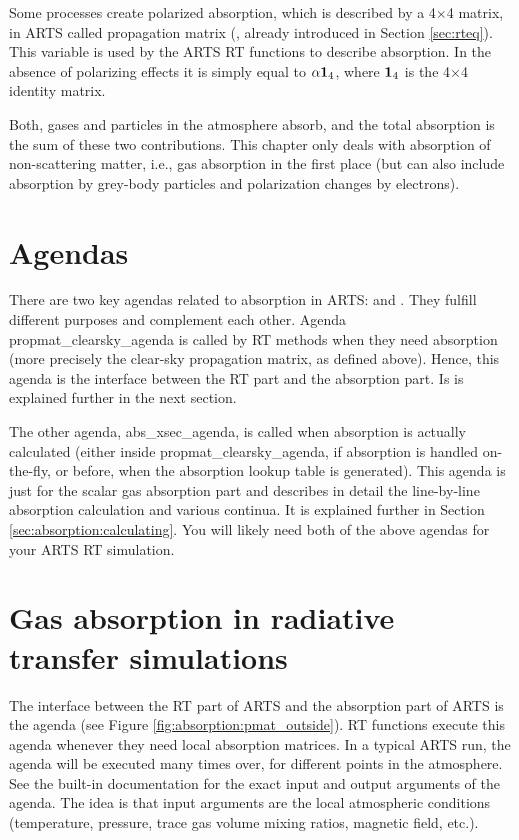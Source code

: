 Some processes create polarized absorption, which is described by a
4$\times$4 matrix, in ARTS called propagation matrix
(, already introduced in Section \ref{sec:rteq}).
This variable is used by the ARTS RT
functions to describe absorption.  In the absence of polarizing
effects it is simply equal to ${\alpha} \mathbf{1}_4$, where $\mathbf{1}_4$
is the 4$\times$4 identity matrix. 

Both, gases and particles in the atmosphere absorb, and the total absorption is
the sum of these two contributions.
This chapter only deals with absorption of non-scattering matter, i.e., gas
absorption in the first place (but can also include absorption by grey-body
particles and polarization changes by electrons).

\section{Agendas}
\label{sec:absorption:agendas}

There are two key agendas related to absorption in ARTS:
 and
.  They fulfill different purposes and
complement each other.  Agenda propmat\_clearsky\_agenda is called by
RT methods when they need absorption (more precisely the clear-sky
propagation matrix, as defined above). Hence, this agenda is the
interface between the RT part and the absorption part. Is is explained
further in the next section. 

The other agenda, abs\_xsec\_agenda, is called when absorption is
actually calculated (either inside propmat\_clearsky\_agenda, if
absorption is handled on-the-fly, or before, when the absorption
lookup table is generated).  This agenda is just for the scalar gas
absorption part and describes in detail the line-by-line absorption
calculation and various continua.  It is explained further in Section
\ref{sec:absorption:calculating}.  You will likely need both of the
above agendas for your ARTS RT simulation.


\section{Gas absorption in radiative transfer simulations}
\label{sec:absorption:abs-rt}

The interface between the RT part of ARTS and the
absorption part of ARTS is the agenda
 (see Figure \ref{fig:absorption:pmat_outside}).  RT functions execute this
agenda whenever they need local absorption matrices.  In a typical
ARTS run, the agenda will be executed many times over, for different
points in the atmosphere.  See the built-in documentation for the
exact input and output arguments of the agenda.  The idea is that
input arguments are the local atmospheric conditions (temperature,
pressure, trace gas volume mixing ratios, magnetic field, etc.).

